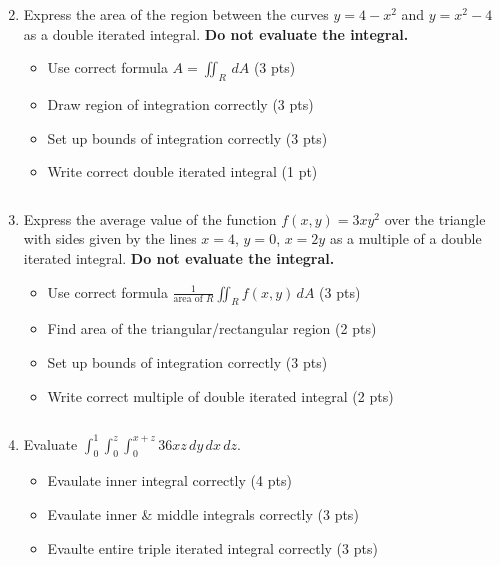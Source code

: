 \documentclass[12pt]{article}
\newcommand{\up}{$~$\vspace*{-0.7in}}
\newcommand{\liner}{\noindent\underline{\hspace*{7in}}}
\newcommand{\ds}{\displaystyle}
\begin{document}
\begin{enumerate}
\newpage\up


\item Express the area of the region between the curves $y=4-x^2$ and $y=x^2-4$ as a double iterated integral. \textbf{Do not evaluate the integral.}

  \begin{itemize}
  \item Use correct formula $A = \iint_{R}\,dA$ (3 pts)
  \item Draw region of integration correctly (3 pts)
  \item Set up bounds of integration correctly (3 pts)
  \item Write correct double iterated integral (1 pt)
  \end{itemize}

\vspace*{7.5in}

\liner

\newpage\up


\item Express the average value of the function $f(x,y)=3xy^2$ over the triangle with sides given by the lines $x=4$, $y=0$, $x=2y$ as a multiple of a double iterated integral. \textbf{Do not evaluate the integral.}

  \begin{itemize}
  \item Use correct formula $\frac{1}{\text{area of }R}\iint_{R}f(x,y)\,dA$ (3 pts)
  \item Find area of the triangular/rectangular region (2 pts)
  \item Set up bounds of integration correctly (3 pts)
  \item Write correct multiple of double iterated integral (2 pts)
  \end{itemize}

\vspace*{7in}

\liner

\newpage\up


\item Evaluate $\ds \int_{0}^{1}\int_0^{z}\int_0^{x+z} 36xz \,dy\,dx\,dz$.

  \begin{itemize}
  \item Evaulate inner integral correctly (4 pts)
  \item Evaulate inner \& middle integrals correctly (3 pts)
  \item Evaulte entire triple iterated integral correctly (3 pts)
  \end{itemize}


\end{enumerate}
\end{document}
